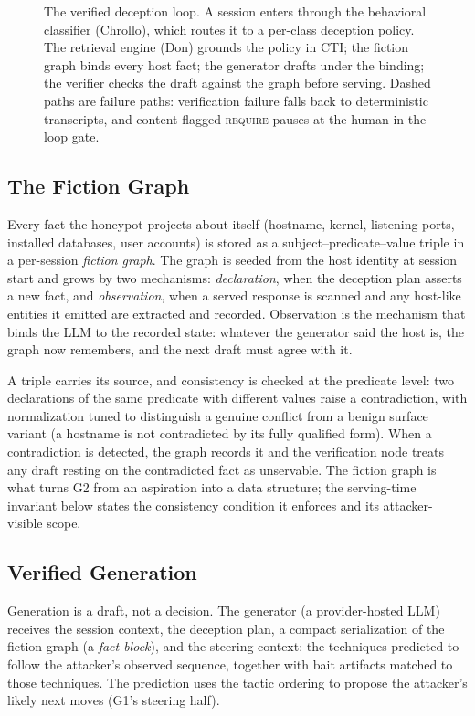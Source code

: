 
\begin{figure}[t]
\centering

\caption{The verified deception loop. A session enters through the
behavioral classifier (Chrollo), which routes it to a per-class deception
policy. The retrieval engine (Don) grounds the policy in CTI; the fiction
graph binds every host fact; the generator drafts under the binding; the
verifier checks the draft against the graph before serving. Dashed paths
are failure paths: verification failure falls back to deterministic
transcripts, and content flagged \textsc{require} pauses at the
human-in-the-loop gate.}
\label{fig:architecture}
\end{figure}

\subsection{The Fiction Graph}
\label{sec:graph}
Every fact the honeypot projects about itself (hostname, kernel, listening
ports, installed databases, user accounts) is stored as a
subject--predicate--value triple in a per-session \emph{fiction graph}.
The graph is seeded from the host identity at session start and grows by
two mechanisms: \emph{declaration}, when the deception plan asserts a new
fact, and \emph{observation}, when a served response is scanned and any
host-like entities it emitted are extracted and recorded. Observation is
the mechanism that binds the LLM to the recorded state: whatever the generator said the
host is, the graph now remembers, and the next draft must agree with it.

A triple carries its source, and consistency is checked at the predicate
level: two declarations of the same predicate with different values raise
a contradiction, with normalization tuned to distinguish a genuine
conflict from a benign surface variant (a hostname is not contradicted by
its fully qualified form). When a contradiction is detected, the graph
records it and the verification node treats any draft resting on the
contradicted fact as unservable. The fiction graph is what turns G2 from
an aspiration into a data structure; the serving-time invariant below
states the consistency condition it enforces and its attacker-visible
scope.

\subsection{Verified Generation}
\label{sec:verify}
Generation is a draft, not a decision. The generator (a provider-hosted
LLM) receives the session context, the deception plan, a compact
serialization of the fiction graph (a \emph{fact block}), and the
steering context: the \attck techniques predicted to follow the
attacker's observed sequence, together with bait artifacts matched to
those techniques. The prediction uses the \attck tactic ordering to
propose the attacker's likely next moves (G1's steering half).

